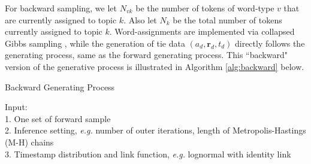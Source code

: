 \documentclass[a4paper]{article}
\begin{document}
                  For backward sampling, we let $N_{vk}$ be the number of tokens of word-type $v$ that are currently assigned to topic $k$. Also let $N_k$ be the total number of tokens currently assigned to topic $k$. Word-assignments are implemented via collapsed Gibbs sampling \citep{griffiths2002gibbs}, while the generation of tie data $(a_d, \boldsymbol{r}_d, t_d)$ directly follows the generating process, same as the forward generating process. This ``backward" version of the generative process is illustrated in Algorithm \ref{alg:backward} below.
                  \begin{algorithm}[H]
                  	\SetAlgoLined
                  	\caption{Backward Generating Process}
                  	Input:\\
                  	1. One set of forward sample\\
                  	2. Inference setting, \textit{e.g.} number of outer iterations, length of Metropolis-Hastings (M-H) chains\\ 
                  	3. Timestamp distribution and link function, \textit{e.g.} lognormal with identity link\\ 
                  	

\end{algorithm}
\end{document}
